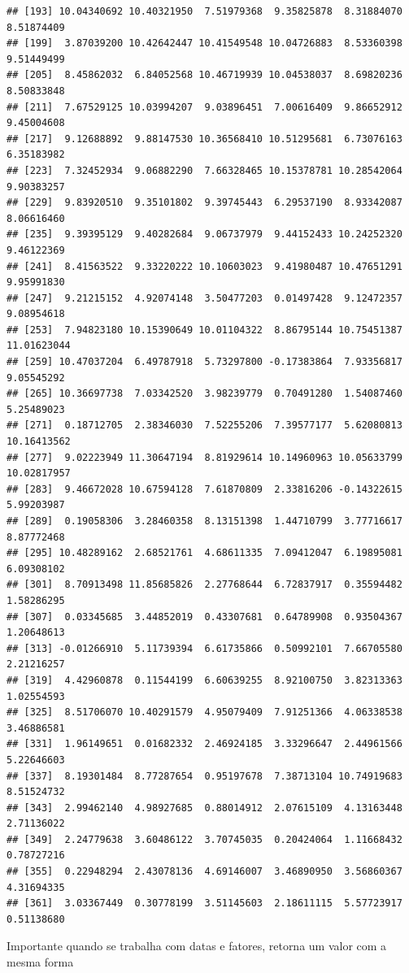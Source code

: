 \documentclass[
]{book}
\newenvironment{Shaded}{\begin{snugshade}}{\end{snugshade}}
\newcommand{\DecValTok}[1]{\textcolor[rgb]{0.00,0.00,0.81}{#1}}
\newcommand{\KeywordTok}[1]{\textcolor[rgb]{0.13,0.29,0.53}{\textbf{#1}}}
\newcommand{\NormalTok}[1]{#1}
\newcommand{\OperatorTok}[1]{\textcolor[rgb]{0.81,0.36,0.00}{\textbf{#1}}}
\newcommand{\StringTok}[1]{\textcolor[rgb]{0.31,0.60,0.02}{#1}}
\begin{document}
\begin{verbatim}
## [193] 10.04340692 10.40321950  7.51979368  9.35825878  8.31884070  8.51874409
## [199]  3.87039200 10.42642447 10.41549548 10.04726883  8.53360398  9.51449499
## [205]  8.45862032  6.84052568 10.46719939 10.04538037  8.69820236  8.50833848
## [211]  7.67529125 10.03994207  9.03896451  7.00616409  9.86652912  9.45004608
## [217]  9.12688892  9.88147530 10.36568410 10.51295681  6.73076163  6.35183982
## [223]  7.32452934  9.06882290  7.66328465 10.15378781 10.28542064  9.90383257
## [229]  9.83920510  9.35101802  9.39745443  6.29537190  8.93342087  8.06616460
## [235]  9.39395129  9.40282684  9.06737979  9.44152433 10.24252320  9.46122369
## [241]  8.41563522  9.33220222 10.10603023  9.41980487 10.47651291  9.95991830
## [247]  9.21215152  4.92074148  3.50477203  0.01497428  9.12472357  9.08954618
## [253]  7.94823180 10.15390649 10.01104322  8.86795144 10.75451387 11.01623044
## [259] 10.47037204  6.49787918  5.73297800 -0.17383864  7.93356817  9.05545292
## [265] 10.36697738  7.03342520  3.98239779  0.70491280  1.54087460  5.25489023
## [271]  0.18712705  2.38346030  7.52255206  7.39577177  5.62080813 10.16413562
## [277]  9.02223949 11.30647194  8.81929614 10.14960963 10.05633799 10.02817957
## [283]  9.46672028 10.67594128  7.61870809  2.33816206 -0.14322615  5.99203987
## [289]  0.19058306  3.28460358  8.13151398  1.44710799  3.77716617  8.87772468
## [295] 10.48289162  2.68521761  4.68611335  7.09412047  6.19895081  6.09308102
## [301]  8.70913498 11.85685826  2.27768644  6.72837917  0.35594482  1.58286295
## [307]  0.03345685  3.44852019  0.43307681  0.64789908  0.93504367  1.20648613
## [313] -0.01266910  5.11739394  6.61735866  0.50992101  7.66705580  2.21216257
## [319]  4.42960878  0.11544199  6.60639255  8.92100750  3.82313363  1.02554593
## [325]  8.51706070 10.40291579  4.95079409  7.91251366  4.06338538  3.46886581
## [331]  1.96149651  0.01682332  2.46924185  3.33296647  2.44961566  5.22646603
## [337]  8.19301484  8.77287654  0.95197678  7.38713104 10.74919683  8.51524732
## [343]  2.99462140  4.98927685  0.88014912  2.07615109  4.13163448  2.71136022
## [349]  2.24779638  3.60486122  3.70745035  0.20424064  1.11668432  0.78727216
## [355]  0.22948294  2.43078136  4.69146007  3.46890950  3.56860367  4.31694335
## [361]  3.03367449  0.30778199  3.51145603  2.18611115  5.57723917  0.51138680
\end{verbatim}

Importante quando se trabalha com datas e fatores, retorna um valor com a mesma forma

\begin{Shaded}
\end{Shaded}
\end{document}
